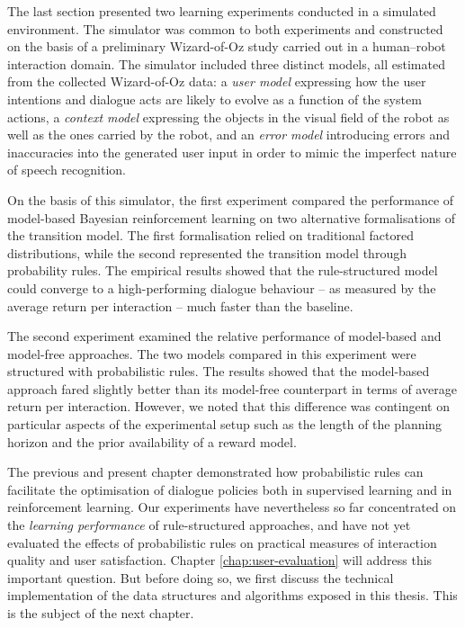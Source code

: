 The last section presented two learning experiments conducted in a simulated environment.  The simulator was common to both experiments and constructed on the basis of a preliminary Wizard-of-Oz study carried out in a human--robot interaction domain. The simulator included three distinct models, all estimated from the collected Wizard-of-Oz data: a \textit{user model} expressing how the user intentions and dialogue acts are likely to evolve as a function of the system actions, a \textit{context model} expressing the objects in the visual field of the robot as well as the ones carried by the robot, and an \textit{error model} introducing errors and inaccuracies into the generated user input in order to mimic the imperfect nature of speech recognition.

On the basis of this simulator, the first experiment compared the performance of model-based Bayesian reinforcement learning on two alternative formalisations of the transition model.  The first formalisation relied on traditional factored distributions, while the second represented the transition model through probability rules. The empirical results showed that the rule-structured model could converge to a high-performing dialogue behaviour -- as measured by the average return per interaction -- much faster than the baseline.

The second experiment examined the relative performance of model-based and model-free approaches.  The two models compared in this experiment were structured with probabilistic rules. The results showed that the model-based approach fared slightly better than its model-free counterpart in terms of average return per interaction.  However, we noted that this difference was contingent on particular aspects of the experimental setup such as the length of the planning horizon and the prior availability of a reward model. 

The previous and present chapter demonstrated how probabilistic rules can facilitate the optimisation of dialogue policies both in supervised learning and in reinforcement learning. Our experiments have nevertheless so far concentrated on the \textit{learning performance} of rule-structured approaches, and have not yet evaluated the effects of probabilistic rules on practical measures of interaction quality and user satisfaction. Chapter \ref{chap:user-evaluation} will address this important question. But before doing so, we first discuss the technical implementation of the data structures and algorithms exposed in this thesis. This is the subject of the next chapter.
